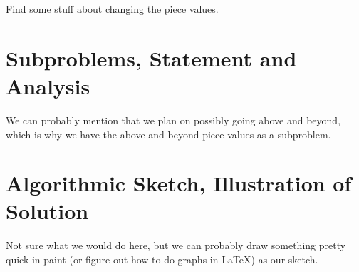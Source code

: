 \documentclass[12pt]{article}
\begin{document}
    Find some stuff about changing the piece values.

    \section{Subproblems, Statement and Analysis}

    We can probably mention that we plan on possibly going above and beyond, which is why we have the above and beyond piece values as a subproblem.

    \section{Algorithmic Sketch, Illustration of Solution}

    Not sure what we would do here, but we can probably draw something pretty quick in paint (or figure out how to do graphs in 
    \LaTeX) as our sketch.
    
\end{document}

